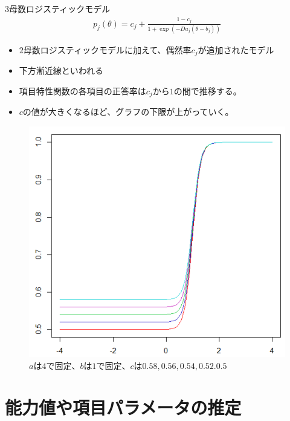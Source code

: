 \documentclass[aspectratio=169, dvipdfmx, 12pt]{beamer}
\begin{document}
\begin{frame}
  \begin{block}{$3$母数ロジスティックモデル}
  \begin{align}
    \displaystyle
    p_j(\theta) = c_j + \frac{1-c_j}{1+\exp(-Da_j(\theta - b_j))}
  \end{align}
  \begin{itemize}
    \item $2$母数ロジスティックモデルに加えて、偶然率$c_j$が追加されたモデル
    \item 下方漸近線といわれる
    \item 項目特性関数の各項目の正答率は$c_j$から$1$の間で推移する。
    \item $c$の値が大きくなるほど、グラフの下限が上がっていく。
  \end{itemize}
\end{block}
\end{frame}
\begin{frame}
  \begin{figure}[H]
    \centering
    \includegraphics[bb = 650 470 1 1,scale = 0.25]{C.png}
    \vspace{4cm}
    \caption{$a$は$4$で固定、$b$は$1$で固定、$c$は$0.58, 0.56, 0.54, 0.52. 0.5$}
  \end{figure}
\end{frame}


\section{能力値や項目パラメータの推定}
\end{document}
